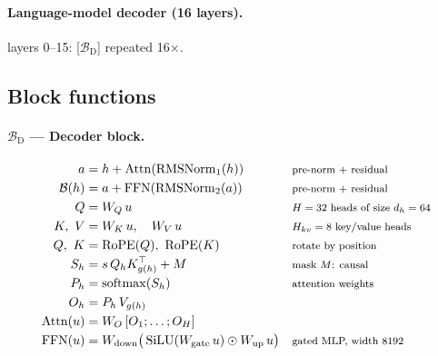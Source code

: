 \documentclass[10pt,a4paper]{article}
\newcommand{\op}[1]{\operatorname{#1}}
\begin{document}
\paragraph{Language-model decoder (16 layers).} 
layers 0--15: [$\mathcal{B}_{\mathrm{D}}$] repeated 16$\times$.
\subsection{Block functions}
\paragraph{$\mathcal{B}_{\mathrm{D}}$ --- Decoder block.}
\begin{align*}
  a &= h + \op{Attn}(\op{RMSNorm}_{1}(h)) && \text{\footnotesize pre-norm + residual} \\
  \mathcal{B}(h) &= a + \op{FFN}(\op{RMSNorm}_{2}(a)) && \text{\footnotesize pre-norm + residual} \\
  Q &= W_Q\,u && \text{\footnotesize $H=32$ heads of size $d_h=64$} \\
  K,\ V &= W_K\,u,\quad W_V\,u && \text{\footnotesize $H_{kv}=8$ key/value heads} \\
  Q,\ K &= \op{RoPE}(Q),\ \op{RoPE}(K) && \text{\footnotesize rotate by position} \\
  S_h &= s\, Q_h K_{g(h)}^{\top} + M && \text{\footnotesize mask $M$: causal} \\
  P_h &= \op{softmax}(S_h) && \text{\footnotesize attention weights} \\
  O_h &= P_h\, V_{g(h)} \\
  \op{Attn}(u) &= W_O\,[O_1;\dots;O_H] \\
  \op{FFN}(u) &= W_{\mathrm{down}}\big(\op{SiLU}(W_{\mathrm{gate}}\,u)\odot W_{\mathrm{up}}\,u\big) && \text{\footnotesize gated MLP, width 8192}
\end{align*}
\end{document}
